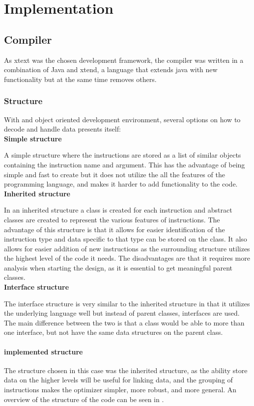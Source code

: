 \chapter{Implementation}
\section{Compiler}
As xtext was the chosen development framework, the compiler was written in a combination of Java and xtend, a language that extends java with new functionality but at the same time removes others. 
\subsection{Structure}
With and object oriented development environment, several options on how to decode and handle data presents itself:
\\ \textbf{Simple structure}

A simple structure where the instructions are stored as a list of similar objects containing the instruction name and argument. This has the advantage of being simple and fast to create but it does not utilize the all the features of the programming language, and makes it harder to add functionality to the code.
\\ \textbf{Inherited structure}

In an inherited structure a class is created for each instruction and abstract classes are created to represent the various features of instructions. The advantage of this structure is that it allows for easier identification of the instruction type and data specific to that type can be stored on the class. It also allows for easier addition of new instructions as the surrounding structure utilizes the highest level of the code it needs. The disadvantages are that it requires more analysis when starting the design, as it is essential to get meaningful parent classes. 
\\ \textbf{Interface structure}

The interface structure is very similar to the inherited structure in that it utilizes the underlying language well but instead of parent classes, interfaces are used. The main difference between the two is that a class would be able to more than one interface, but not have the same data structures on the parent class.
\subsubsection{implemented structure}
The structure chosen in this case was the inherited structure, as the ability store data on the higher levels will be useful for linking data, and the grouping of instructions makes the optimizer simpler, more robust, and more general. An overview of the structure of the code can be seen in . 


